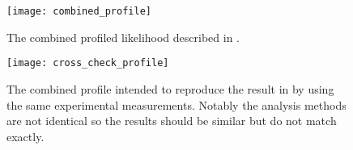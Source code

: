 \begin{figure}
\centering
\texttt{[image: combined\_profile]}
\caption{The combined profiled likelihood described in .}
\label{fig:combined_profile}
\end{figure}

\begin{figure}
\centering
\texttt{[image: cross\_check\_profile]}
\caption{The combined profile intended to reproduce the result in \cite{picoreti} by using the same experimental measurements. Notably the analysis methods are not identical so the results should be similar but do not match exactly.}
\label{fig:cross_check_profile}
\end{figure}
